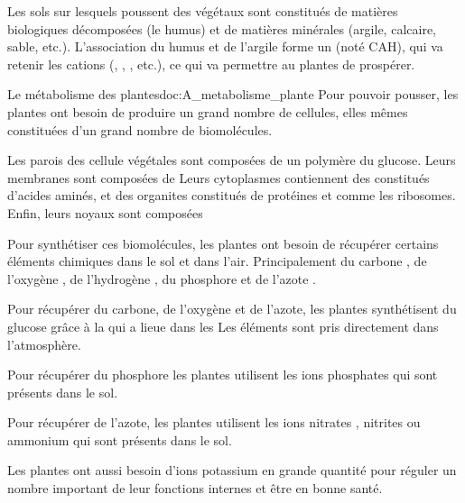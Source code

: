 \tetePremStssAlim
\vspace*{-30pt}

\begin{contexte}
  Les sols sur lesquels poussent des végétaux sont constitués de matières biologiques décomposées (le humus) et de matières minérales (argile, calcaire, sable, etc.).
  L'association du humus et de l'argile forme un  (noté CAH), qui va retenir les cations (\ionPotassium, \ionSodium, \ammonium, etc.), ce qui va permettre au plantes de prospérer.

\end{contexte}

\begin{doc}{Le métabolisme des plantes}{doc:A_metabolisme_plante}
  Pour pouvoir pousser, les plantes ont besoin de produire un grand nombre de cellules, elles mêmes constituées d'un grand nombre de biomolécules.

  \begin{importants}
    Les parois des cellule végétales sont composées de  un polymère du glucose.
    Leurs membranes sont composées de  
    Leurs cytoplasmes contiennent des  constitués d'acides aminés, et des organites constitués de protéines et  comme les ribosomes.
    Enfin, leurs noyaux sont composées 
  \end{importants}

  Pour synthétiser ces biomolécules, les plantes ont besoin de récupérer certains éléments chimiques dans le sol et dans l'air. Principalement du carbone \carbone, de l'oxygène \oxygene, de l'hydrogène \hydrogene, du phosphore \phosphore et de l'azote \azote.

  \begin{listePoints}
    \item Pour récupérer du carbone, de l'oxygène et de l'azote, les plantes synthétisent du glucose grâce à la  qui a lieue dans les  Les éléments sont pris directement dans l'atmosphère.
  
    \item Pour récupérer du phosphore les plantes utilisent les ions phosphates \ionPhosphate qui sont présents dans le sol.
  
    \item Pour récupérer de l'azote, les plantes utilisent les ions nitrates \nitrate, nitrites \nitrite ou ammonium \ammonium qui sont présents dans le sol.
  \end{listePoints}
  Les plantes ont aussi besoin d'ions potassium \ionPotassium en grande quantité pour réguler un nombre important de leur fonctions internes et être en bonne santé.
\end{doc}

